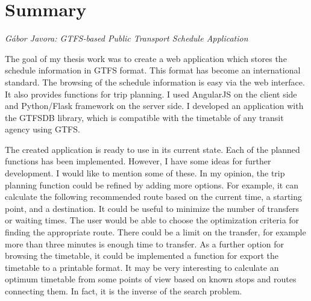 \documentclass[a4paper,12pt]{article}
\begin{document}
\pagestyle{empty}

\section*{Summary}

\textit{Gábor Javora: GTFS-based Public Transport Schedule Application}

\bigskip

The goal of my thesis work was to create a web application which stores the schedule information in GTFS format. This format has become an international standard. The browsing of the schedule information is easy via the web interface. It also provides functions for trip planning. I used AngularJS on the client side and Python/Flask framework on the server side. I developed an application with the GTFSDB library, which is compatible with the timetable of any transit agency using GTFS.

The created application is ready to use in its current state. Each of the planned functions has been implemented. However, I have some ideas for further development. I would like to mention some of these. In my opinion, the trip planning function could be refined by adding more options. For example, it can calculate the following recommended route based on the current time, a starting point, and a destination. It could be useful to minimize the number of transfers or waiting times. The user would be able to choose the optimization criteria for finding the appropriate route. There could be a limit on the transfer, for example more than three minutes is enough time to transfer. As a further option for browsing the timetable, it could be implemented a function for export the timetable to a printable format. It may be very interesting to calculate an optimum timetable from some points of view based on known stops and routes connecting them. In fact, it is the inverse of the search problem.
\end{document}
